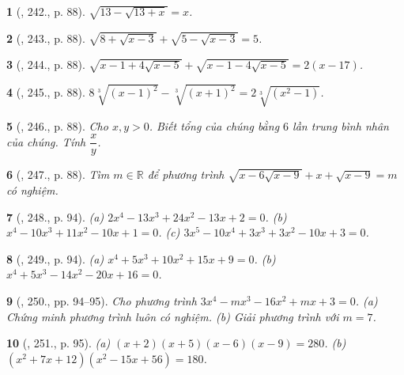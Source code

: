 \documentclass{article}
\newtheorem{baitoan}{}
\begin{document}
\begin{baitoan}[\cite{Tuyen_Toan_9_old}, 242., p. 88]
	$\sqrt{13 - \sqrt{13 + x}} = x$.
\end{baitoan}

\begin{baitoan}[\cite{Tuyen_Toan_9_old}, 243., p. 88]
	$\sqrt{8 + \sqrt{x - 3}} + \sqrt{5 - \sqrt{x - 3}} = 5$.
\end{baitoan}

\begin{baitoan}[\cite{Tuyen_Toan_9_old}, 244., p. 88]
	$\sqrt{x - 1 + 4\sqrt{x - 5}} + \sqrt{x - 1 - 4\sqrt{x - 5}} = 2(x - 17)$.
\end{baitoan}

\begin{baitoan}[\cite{Tuyen_Toan_9_old}, 245., p. 88]
	$8\sqrt[3]{(x - 1)^2} - \sqrt[3]{(x + 1)^2} = 2\sqrt[3]{(x^2 - 1)}$.
\end{baitoan}

\begin{baitoan}[\cite{Tuyen_Toan_9_old}, 246., p. 88]
	Cho $x,y > 0$. Biết tổng của chúng bằng $6$ lần trung bình nhân của chúng. Tính $\dfrac{x}{y}$.
\end{baitoan}

\begin{baitoan}[\cite{Tuyen_Toan_9_old}, 247., p. 88]
	Tìm $m\in\mathbb{R}$ để phương trình $\sqrt{x - 6\sqrt{x - 9}} + x + \sqrt{x - 9} = m$ có nghiệm.
\end{baitoan}

\begin{baitoan}[\cite{Tuyen_Toan_9_old}, 248., p. 94]
	(a) $2x^4 - 13x^3 + 24x^2 - 13x + 2 = 0$. (b) $x^4 - 10x^3 + 11x^2 - 10x + 1 = 0$. (c) $3x^5 - 10x^4 + 3x^3 + 3x^2 - 10x + 3 = 0$.
\end{baitoan}

\begin{baitoan}[\cite{Tuyen_Toan_9_old}, 249., p. 94]
	(a) $x^4 + 5x^3 + 10x^2 + 15x + 9 = 0$. (b) $x^4 + 5x^3 - 14x^2 - 20x + 16 = 0$.
\end{baitoan}

\begin{baitoan}[\cite{Tuyen_Toan_9_old}, 250., pp. 94--95]
	Cho phương trình $3x^4 - mx^3 - 16x^2 + mx + 3 = 0$. (a) Chứng minh phương trình luôn có nghiệm. (b) Giải phương trình với $m = 7$.
\end{baitoan}

\begin{baitoan}[\cite{Tuyen_Toan_9_old}, 251., p. 95]
	(a) $(x + 2)(x + 5)(x - 6)(x - 9) = 280$. (b) $(x^2 + 7x + 12)(x^2 - 15x + 56) = 180$.
\end{baitoan}
\end{document}
